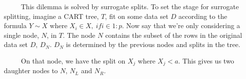\documentclass[12pt,twoside]{reedthesis}
\begin{document}
  ~~~~~This dilemma is solved by surrogate splits. To set the stage for
  surrogate splitting, imagine a CART tree, \(T\), fit on some data set
  \(D\) according to the formula \(Y \sim X\) where
  \(X_i \in X, \ if i \in 1:p\). Now say that we're only considering a
  single node, \(N\), in \(T\). The node \(N\) contains the subset of the
  rows in the original data set \(D\), \(D_N\). \(D_N\) is determined by
  the previous nodes and splits in the tree.
  
  \begin{center}
  \end{center}
  
  ~~~~~On that node, we have the split on \(X_j\) where \(X_j < a\). This
  gives us two daughter nodes to \(N\), \(N_L\) and \(N_R\).
  
  \usetikzlibrary{positioning}
  
  \begin{center}
  \end{center}
  
\end{document}
